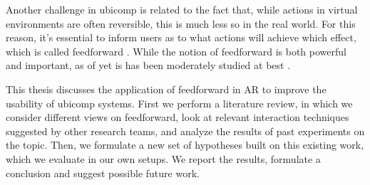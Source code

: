 \documentclass[a4paper,fancychapters]{article}
\begin{document}
Another challenge in ubicomp is related to the fact that, while actions in virtual environments are often reversible, this is much less so in the real world. For this reason, it's essential to inform users as to what actions will achieve which effect, which is called feedforward \cite{djajadiningrat2002but}. While the notion of feedforward is both powerful and important, as of yet is has been moderately studied at best \cite{vermeulen2013crossing}. 

This thesis discusses the application of feedforward in AR to improve the usability of ubicomp systems. First we perform a literature review, in which we consider different views on feedforward, look at relevant interaction techniques suggested by other research teams, and analyze the results of past experiments on the topic. Then, we formulate a new set of hypotheses built on this existing work, which we evaluate in our own setups. We report the results, formulate a conclusion and suggest possible future work.


\end{document}

